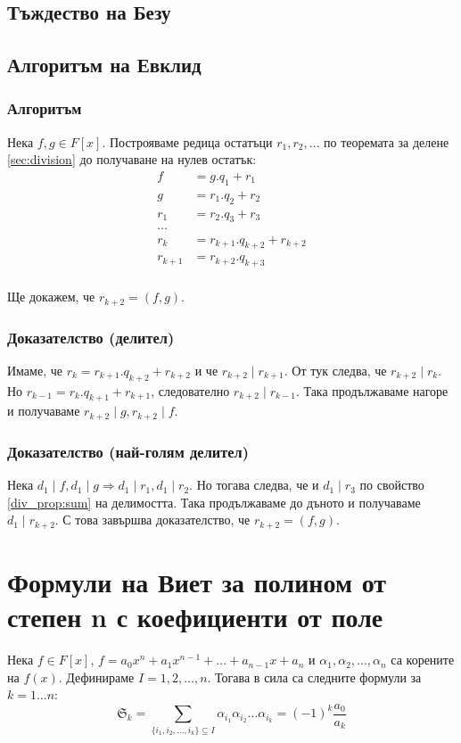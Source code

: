 \documentclass[fleqn,12pt]{article}
\begin{document}
\subsection{Тъждество на Безу}

\subsection{Алгоритъм на Евклид}
\subsubsection{Алгоритъм}
Нека $f,g \in F[x]$. Построяваме редица остатъци $r_1, r_2, \dots$ по теоремата за делене \ref{sec:division} до получаване на нулев остатък:
\begin{align}
f &= g . q_1 + r_1 \\
g &= r_1 . q_2 + r_2 \\
r_1 &= r_2 . q_3 + r_3 \\
\dots \\
r_k &= r_{k + 1} . q_{k + 2} + r_{k + 2} \\
r_{k + 1} &= r_{k + 2} . q_{k + 3} \\
\end{align}

Ще докажем, че $r_{k+2} = (f,g)$.

\subsubsection{Доказателство (делител)}
Имаме, че $r_k = r_{k + 1} . q_{k + 2} + r_{k + 2}$ и че $r_{k+2} \mid r_{k+1}$.
От тук следва, че $r_{k+2} \mid r_k$. Но $r_{k - 1} = r_{k} . q_{k + 1} + r_{k + 1}$,
следователно $r_{k+2} \mid r_{k-1}$. Така продължаваме нагоре и получаваме $r_{k+2} \mid g, r_{k+2} \mid f$.

\subsubsection{Доказателство (най-голям делител)}
Нека $d_1 \mid f, d_1 \mid g \Rightarrow d_1 \mid r_1, d_1 \mid r_2$.
Но тогава следва, че и $d_1 \mid r_3$ по свойство \ref{div_prop:sum} на делимостта.
Така продължаваме до дъното и получаваме $d_1 \mid r_{k+2}$. С това завършва доказателство, че $r_{k+2} = (f,g)$.


\section{Формули на Виет за полином от степен n с коефициенти от поле}
Нека $f \in F[x]$, $f = a_0 x^n + a_1 x^{n-1} + \dots + a_{n-1} x + a_n$
и $\alpha_1, \alpha_2, \dots, \alpha_n$ са корените на $f(x)$. Дефинираме $I = {1, 2, \dots, n}$. 
Тогава в сила са следните формули за $k=1\dots n$:
\[ \mathfrak{S}_k = \sum_{\{i_1, i_2, \dots, i_k \} \subseteq I} \alpha_{i_1} \alpha_{i_2} \dots \alpha_{i_k} = (-1)^k \frac{a_0}{a_k} \]
\end{document}
